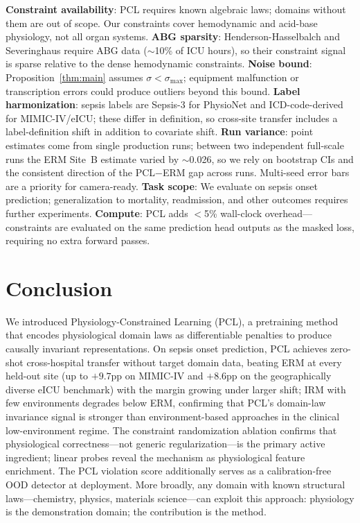 \documentclass{article}
\begin{document}
\textbf{Constraint availability}: PCL requires known algebraic laws; domains without them are out of scope. Our constraints cover hemodynamic and acid-base physiology, not all organ systems.
\textbf{ABG sparsity}: Henderson-Hasselbalch and Severinghaus require ABG data ($\sim$10\% of ICU hours), so their constraint signal is sparse relative to the dense hemodynamic constraints.
\textbf{Noise bound}: Proposition~\ref{thm:main} assumes $\sigma < \sigma_{\max}$; equipment malfunction or transcription errors could produce outliers beyond this bound.
\textbf{Label harmonization}: sepsis labels are Sepsis-3 for PhysioNet and ICD-code-derived for MIMIC-IV/eICU; these differ in definition, so cross-site transfer includes a label-definition shift in addition to covariate shift.
\textbf{Run variance}: point estimates come from single production runs; between two independent full-scale runs the ERM Site~B estimate varied by $\sim$0.026, so we rely on bootstrap CIs and the consistent direction of the PCL$-$ERM gap across runs. Multi-seed error bars are a priority for camera-ready.
\textbf{Task scope}: We evaluate on sepsis onset prediction; generalization to mortality, readmission, and other outcomes requires further experiments.
\textbf{Compute}: PCL adds $<$5\% wall-clock overhead---constraints are evaluated on the same prediction head outputs as the masked loss, requiring no extra forward passes.

\section{Conclusion}
\label{sec:conclusion}

We introduced Physiology-Constrained Learning (PCL), a pretraining method that encodes physiological domain laws as differentiable penalties to produce causally invariant representations.
On sepsis onset prediction, PCL achieves zero-shot cross-hospital transfer without target domain data, beating ERM at every held-out site (up to $+9.7$pp on MIMIC-IV and $+8.6$pp on the geographically diverse eICU benchmark) with the margin growing under larger shift; IRM with few environments degrades below ERM, confirming that PCL's domain-law invariance signal is stronger than environment-based approaches in the clinical low-environment regime.
The constraint randomization ablation confirms that physiological correctness---not generic regularization---is the primary active ingredient; linear probes reveal the mechanism as physiological feature enrichment.
The PCL violation score additionally serves as a calibration-free OOD detector at deployment.
More broadly, any domain with known structural laws---chemistry, physics, materials science---can exploit this approach: physiology is the demonstration domain; the contribution is the method.
\end{document}
